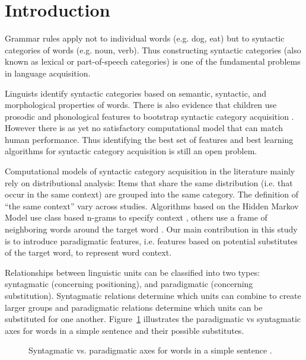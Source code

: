 \section{Introduction}
\label{sec:intro}

Grammar rules apply not to individual words (e.g. dog, eat) but to
syntactic categories of words (e.g. noun, verb).  Thus constructing
syntactic categories (also known as lexical or part-of-speech
categories) is one of the fundamental problems in language
acquisition.

Linguists identify syntactic categories based on semantic, syntactic,
and morphological properties of words.  There is also evidence that
children use prosodic and phonological features to bootstrap syntactic
category acquisition \cite{ambridge2011child}.  However there is as
yet no satisfactory computational model that can match human
performance.  Thus identifying the best set of features and best
learning algorithms for syntactic category acquisition is still an
open problem.

Computational models of syntactic category acquisition in the
literature mainly rely on distributional analysis: Items that share
the same distribution (i.e. that occur in the same context) are
grouped into the same category.  The definition of ``the same
context'' vary across studies.  Algorithms based on the Hidden Markov
Model use class based n-grams to specify context
\cite{Brown:1992:CNG:176313.176316}, others use a frame of neighboring
words around the target word \cite{Schutze:1995:DPT:976973.976994}.
Our main contribution in this study is to introduce paradigmatic
features, i.e. features based on potential substitutes of the target
word, to represent word context.

Relationships between linguistic units can be classified into two
types: syntagmatic (concerning positioning), and paradigmatic
(concerning substitution).  Syntagmatic relations determine which
units can combine to create larger groups and paradigmatic relations
determine which units can be substituted for one another.
Figure~\ref{fig:paradigmatic} illustrates the paradigmatic vs
syntagmatic axes for words in a simple sentence and their possible
substitutes.

\begin{figure}[h] \centering

\caption{Syntagmatic vs. paradigmatic axes for words in a simple
  sentence \cite{chandler2007semiotics}.}
\label{fig:paradigmatic}
\end{figure}

